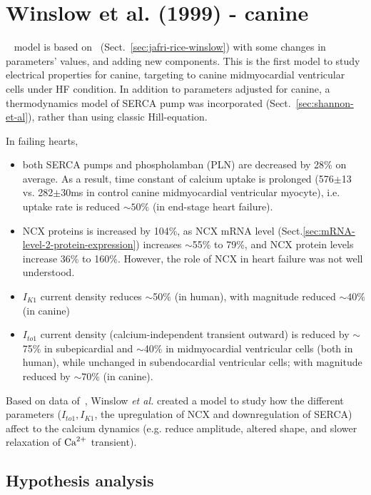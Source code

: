 \section{Winslow et al. (1999) - canine}
\label{sec:winslow-et-al}

~\citep{winslow1999} model is based on~\citep{jafri1998cad}
(Sect.~\ref{sec:jafri-rice-winslow}) with some changes in parameters' values,
and adding new components.
This is the first model to study electrical properties for canine, targeting to
canine midmyocardial ventricular cells under HF condition.
In addition to parameters adjusted for canine, a thermodynamics model of SERCA
pump was incorporated (Sect.~\ref{sec:shannon-et-al}), rather than using classic
Hill-equation.

In failing hearts,
\begin{itemize}
\item both SERCA pumps and phospholamban (PLN) are decreased by 28\%
  on average. As a result, time constant of calcium uptake is
  prolonged (576$\pm$13 vs. 282$\pm$30ms in control canine
  midmyocardial ventricular myocyte), i.e. uptake rate is reduced
  $\sim 50\%$ (in end-stage heart failure).

\item NCX proteins is increased by 104\%, as NCX mRNA level
(Sect.\ref{sec:mRNA-level-2-protein-expression}) increases $\sim$55\% to 79\%,
and NCX protein levels increase 36\% to 160\%. However, the role of NCX in heart
failure was not well
  understood.

\item $I_{K1}$ current density reduces $\sim$50\% (in human), with
  magnitude reduced $\sim 40\%$ (in canine)

\item $I_{to1}$ current density (calcium-independent transient outward) is
reduced by $\sim$75\% in subepicardial and $\sim$40\% in midmyocardial
  ventricular cells (both in human), while unchanged in subendocardial
  ventricular cells; with magnitude reduced by $\sim 70\%$ (in
  canine). 
\end{itemize}

Based on data of~\citep{ORourke1999}, Winslow {\it et al.}  created a
model to study how the different parameters ($I_{to1},I_{K1}$, the
upregulation of NCX and downregulation of SERCA) affect to the
calcium dynamics (e.g. reduce amplitude, altered shape, and slower
relaxation of ${\text{Ca}^{2+}}$ transient).

\subsection{Hypothesis analysis}
\label{sec:hypothesis-analysis-15}


